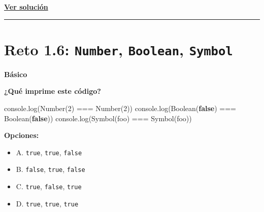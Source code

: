 \documentclass[
  letterpaper,
  DIV=11,
  numbers=noendperiod]{scrreprt}
\newenvironment{Shaded}{\begin{snugshade}}{\end{snugshade}}
\newcommand{\BuiltInTok}[1]{\textcolor[rgb]{0.00,0.23,0.31}{#1}}
\newcommand{\DecValTok}[1]{\textcolor[rgb]{0.68,0.00,0.00}{#1}}
\newcommand{\FunctionTok}[1]{\textcolor[rgb]{0.28,0.35,0.67}{#1}}
\newcommand{\KeywordTok}[1]{\textcolor[rgb]{0.00,0.23,0.31}{\textbf{#1}}}
\newcommand{\NormalTok}[1]{\textcolor[rgb]{0.00,0.23,0.31}{#1}}
\newcommand{\OperatorTok}[1]{\textcolor[rgb]{0.37,0.37,0.37}{#1}}
\newcommand{\StringTok}[1]{\textcolor[rgb]{0.13,0.47,0.30}{#1}}
\providecommand{\tightlist}{%
  \setlength{\itemsep}{0pt}\setlength{\parskip}{0pt}}
\begin{document}
\textbf{\hyperref[sec-sol-cap1-reto5]{Ver solución}}

\begin{center}\rule{0.5\linewidth}{0.5pt}\end{center}

\section{\texorpdfstring{Reto 1.6: \texttt{Number}, \texttt{Boolean},
\texttt{Symbol}}{Reto 1.6: Number, Boolean, Symbol}}\label{sec-cap1-reto6}

\begin{tcolorbox}[enhanced jigsaw, left=2mm, toprule=.15mm, leftrule=.75mm, breakable, colback=white, coltitle=black, bottomtitle=1mm, arc=.35mm, rightrule=.15mm, colframe=quarto-callout-caution-color-frame, opacitybacktitle=0.6, toptitle=1mm, opacityback=0, titlerule=0mm, title=\textcolor{quarto-callout-caution-color}{\faFire}\hspace{0.5em}{Dificultad}, bottomrule=.15mm, colbacktitle=quarto-callout-caution-color!10!white]

\textbf{Básico}

\end{tcolorbox}

\textbf{¿Qué imprime este código?}

\begin{Shaded}
\begin{Highlighting}[]
\BuiltInTok{console}\OperatorTok{.}\FunctionTok{log}\NormalTok{(}\BuiltInTok{Number}\NormalTok{(}\DecValTok{2}\NormalTok{) }\OperatorTok{===} \BuiltInTok{Number}\NormalTok{(}\DecValTok{2}\NormalTok{))}
\BuiltInTok{console}\OperatorTok{.}\FunctionTok{log}\NormalTok{(}\BuiltInTok{Boolean}\NormalTok{(}\KeywordTok{false}\NormalTok{) }\OperatorTok{===} \BuiltInTok{Boolean}\NormalTok{(}\KeywordTok{false}\NormalTok{))}
\BuiltInTok{console}\OperatorTok{.}\FunctionTok{log}\NormalTok{(}\BuiltInTok{Symbol}\NormalTok{(}\StringTok{\textquotesingle{}foo\textquotesingle{}}\NormalTok{) }\OperatorTok{===} \BuiltInTok{Symbol}\NormalTok{(}\StringTok{\textquotesingle{}foo\textquotesingle{}}\NormalTok{))}
\end{Highlighting}
\end{Shaded}

\textbf{Opciones:}

\begin{itemize}
\tightlist
\item
  A. \texttt{true}, \texttt{true}, \texttt{false}
\item
  B. \texttt{false}, \texttt{true}, \texttt{false}
\item
  C. \texttt{true}, \texttt{false}, \texttt{true}
\item
  D. \texttt{true}, \texttt{true}, \texttt{true}
\end{itemize}
\end{document}

